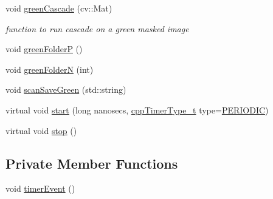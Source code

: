 \begin{DoxyCompactItemize}
void \hyperlink{classCamera_a5dd9bbe1eac3485d2fb835e21f0d9a9d}{green\+Cascade} (cv\+::\+Mat)
\begin{DoxyCompactList}\small\item\em function to run cascade on a green masked image \end{DoxyCompactList}\item 
void \hyperlink{classCamera_ac8f74b6c456d6fc7e9e83e746f8fc6c5}{green\+FolderP} ()
\item 
void \hyperlink{classCamera_ac212835924bf4cee1b8c477a6b79f4d2}{green\+FolderN} (int)
\item 
void \hyperlink{classCamera_a06cf0ed4a2b79d95637ddeb3301d3856}{scan\+Save\+Green} (std\+::string)
\item 
virtual void \hyperlink{classCppTimer_a64989025caa3c030c6c397ca76a2d20b}{start} (long nanosecs, \hyperlink{CppTimer_8h_a110d07ab6a96d7815149d3d95435790a}{cpp\+Timer\+Type\+\_\+t} type=\hyperlink{CppTimer_8h_a110d07ab6a96d7815149d3d95435790aae4379d044711537d9ce3b3b58c575c58}{P\+E\+R\+I\+O\+D\+IC})
\item 
virtual void \hyperlink{classCppTimer_a4bb95ddee98a536d0818b8f6096bf7e7}{stop} ()
\end{DoxyCompactItemize}
\subsection*{Private Member Functions}
\begin{DoxyCompactItemize}
\item 
void \hyperlink{classCamera_afcf6ca7256cd36f2f4a5ba088d67090a}{timer\+Event} ()
\end{DoxyCompactItemize}
